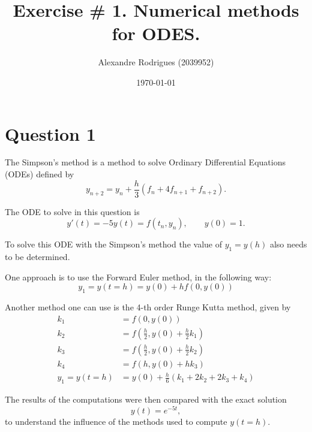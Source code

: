 \documentclass[a4paper, 11pt]{article}
\begin{document}
	
	\title{Exercise \# 1. Numerical methods for ODES. }
	\author{{\small Alexandre Rodrigues (2039952)}}
	\date{\today}
	
	\maketitle
	
		\section*{Question 1}
		
		The Simpson's method is a method to solve Ordinary Differential Equations (ODEs) defined by
		\begin{equation}
			y_{n+2} = y_n + \frac{h}{3}\left( f_n + 4 f_{n+1} + f_{n+2} \right).
		\end{equation}

		The ODE to solve in this question is 
		\begin{equation}
			y'(t) = -5y(t) = f(t_n,y_n),	\qquad y(0) =1.
		\end{equation}
		
		To solve this ODE with the Simpson's method the value of $ y_1 = y(h) $ also needs to be determined.
		
		One approach is to use the Forward Euler method, in the following way:
		\begin{equation}
			y_1 = y(t = h) = y(0) + h f(0,y(0))
		\end{equation}
	
		Another method one can use is the 4-th order Runge Kutta method, given by
		\begin{align}
			k_1 &= f(0,y(0)) \\
			k_2 &= f\left(\frac{h}{2},y(0) + \frac{h}{2}k_1\right) \\
			k_3 &= f\left(\frac{h}{2},y(0) + \frac{h}{2}k_2\right)\\
			k_4 &= f\left(h,y(0) + hk_3\right) \\
			y_1 = y(t = h) &= y(0) + \frac{h}{6} \left(k_1 + 2k_2 + 2k_3 + k_4 \right)
		\end{align}
				
		The results of the computations were then compared with the exact solution
		\begin{equation}
			y(t) = e^{-5t},
		\end{equation}
		to understand the influence of the methods used to compute $y(t=h)$.
		
\end{document}
